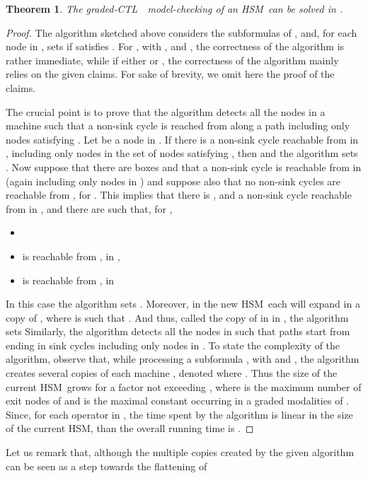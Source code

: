 \documentclass[letterpaper,twocolumn,10pt]{article}
\newtheorem{theorem}{Theorem}
\def    \ctl        {\mbox{\textsc{CTL }\xspace}}
\newcommand{\HSM}{HSM}
\begin{document}
\begin{theorem}\label{theo:ghsmMc}
The graded-\ctl\ model-checking of an \HSM\  can be solved in .
\end{theorem}
\begin{proof}
The algorithm sketched above considers the subformulas  of , and,
for each node  in ,   sets  if  satisfies .
For , with , and , the correctness of the algorithm is rather immediate,
while if either   or ,
the correctness of the  algorithm mainly relies on the given claims.
For sake of brevity, we omit here the proof of the claims.

The crucial point is to prove that the algorithm
detects all the nodes  in a machine  such that
 a non-sink cycle is reached from   along a path  including only nodes satisfying .
 Let  be a node in . If there is a  non-sink cycle  reachable
from  in  ,
including only nodes in the set  of nodes satisfying , then 
and  the algorithm sets .
Now suppose that there are boxes  and that a  non-sink cycle is reachable from  in
 (again including only nodes in ) and suppose also that no non-sink cycles are reachable from
, for . This implies that
there is ,
and a  non-sink cycle  reachable from  in  ,
and
there are  
 such that, for ,
\begin{itemize}
\item

\item
  is reachable from , in ,
\item
 is reachable from , in 

\end{itemize}
In this case the algorithm
sets .
Moreover, in  the new \HSM\, each  will expand in a
copy  of ,
where  is such that . And thus, called  the copy of
 in  in ,  the algorithm sets 
Similarly, the algorithm detects all the nodes  in  such that  paths  start from
  ending
in sink cycles including only nodes in .
To state the complexity of the algorithm, observe that, while processing a subformula
, with 
and  , the algorithm creates several copies of each
machine ,
 denoted  where  . Thus the size of the
current \HSM\ grows for a factor not exceeding  , where   is the maximum number of exit
nodes of  and  is the maximal constant occurring in a graded modalities of .
Since, for each  operator in , the time spent by  the algorithm is linear in the size of the current
\HSM, than the overall running time is .
\end{proof}
Let us remark that, although the multiple copies created by the given algorithm can be seen
as a  step towards the flattening of
\end{document}
